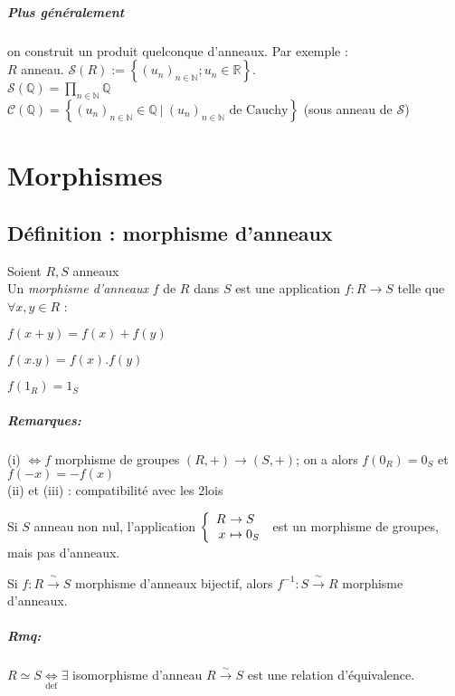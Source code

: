 \documentclass[reqno,a4paper,10pt]{report}
\makeatletter
\newcommand{\set}[1]{\left\lbrace #1 \right\rbrace} %
\newcommand{\IR}{\ensuremath{\mathbb{R}}\xspace} %
\newcommand{\IN}{\ensuremath{\mathbb{N}}\xspace} %
\newcommand{\IQ}{\ensuremath{\mathbb{Q}}\xspace} %
\newcommand{\bij}{\overset{\!\sim}{\to}} %
\newcommand{\such}{\ | \ }
\newcommand{\tdef}[1]{\underset{\text{def}}{ #1 }}
\let\olditemize=\itemize%
\renewenvironment{itemize}{%
    \olditemize%
  }{%
    \@noparlisttrue%
    \endlist%
  }%
\let\oldenumerate=\enumerate%
\renewenvironment{enumerate}{%
    \oldenumerate%
  }{%
    \@noparlisttrue%
    \endlist%
  }%
\makeatother
\begin{document}
\paragraph{Plus généralement}
on construit un produit quelconque d'anneaux. Par exemple : \\
$R$ anneau. $\mathscr{S}(R) := \set{(u_n)_{n\in \IN}; u_n \in \IR}$.\\
$\mathscr{S}(\IQ)=\prod_{n\in \IN} \IQ$\\
$\mathscr{C}(\IQ)=\set{(u_n)_{n\in \IN} \in \mathscr{\IQ} \such (u_n)_{n\in
\IN} \text{ de Cauchy}}$ (sous anneau de $\mathscr{S}$)

\chapter{Morphismes}
\section{Définition : morphisme d'anneaux}
Soient $R,S$ anneaux\\
Un \emph{morphisme d'anneaux} $f$ de $R$ dans $S$ est une application $f:
R \to S$ telle que $\forall x,y \in R$ :
\begin{enumerate}[(i)]
  \item $f(x+y) = f(x)+f(y)$
  \item $f(x.y) = f(x).f(y)$
  \item $f(1_R) = 1_S$
\end{enumerate}
\paragraph{Remarques:}
\begin{itemize}
  \item (i) $\iff f$ morphisme de groupes $(R,+) \to (S,+)$; on a alors
    $f(0_R) = 0_S$ et $f(-x) = -f(x)$\\
    (ii) et (iii) : compatibilité avec les 2\iemes lois
  \item Si $S$ anneau non nul, l'application $\left\{
    \begin{array}{r@{\ }l}
      R &\to S\\
      x &\mapsto 0_S
    \end{array}
      \right.$ est un morphisme de groupes, mais pas d'anneaux.
  \item Si $f: R \bij S$ morphisme d'anneaux bijectif, alors $f^{-1}:
    S \bij R$ morphisme d'anneaux.
\end{itemize}
\paragraph{Rmq:}
$R \simeq S \tdef{\iff} \exists$ isomorphisme d'anneau $R \bij S$
est une relation d'équivalence.
\end{document}

